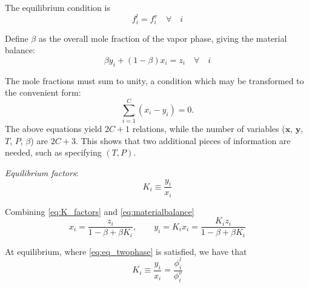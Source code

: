 \documentclass[english]{../thermomemo/thermomemo}
\newcommand*{\vektor}[1]{\boldsymbol{#1}}%
\begin{document}
The equilibrium condition is 
\begin{equation}
  f_i^l = f_i^v \quad \forall \quad i
  \label{eq:eq_twophase}
\end{equation}

Define $\beta$ as the overall mole fraction of the vapor phase, giving the material balance:
\begin{equation}
  \beta y_i + (1-\beta)x_i = z_i \quad \forall \quad i
  \label{eq:materialbalance}
\end{equation}

The mole fractions must sum to unity, a condition which may be transformed to the convenient form:
\begin{equation}
  \sum_{i=1}^C \left( x_i - y_i \right) = 0.
  \label{eq:mole_frac_sum}
\end{equation}
The above equations yield $2C + 1$ relations, while the number of variables ($\vektor{x}$, $\vektor{y}$, $T$, $P$, $\beta$) are $2C + 3$. 
This shows that two additional pieces of information are needed, such as specifying $(T,P)$.


\textit{Equilibrium factors}:
\begin{equation}
  K_i \equiv \frac{y_i}{x_i}
  \label{eq:K_factors}
\end{equation}


Combining \eqref{eq:K_factors} and \eqref{eq:materialbalance}
\begin{equation}
  x_i = \frac{z_i}{1 - \beta + \beta K_i}, \quad\quad y_i = K_i x_i = \frac{K_i z_i}{1 - \beta + \beta K_i} 
  \label{eq:xy_and_Kbeta}
\end{equation}

At equilibrium, where \eqref{eq:eq_twophase} is satisfied, we have that 
\begin{equation}
  K_i \equiv \frac{y_i}{x_i} = \frac{\phi_i^l}{\phi_i^v}
  \label{eq:K_eq}
\end{equation}
\end{document}
